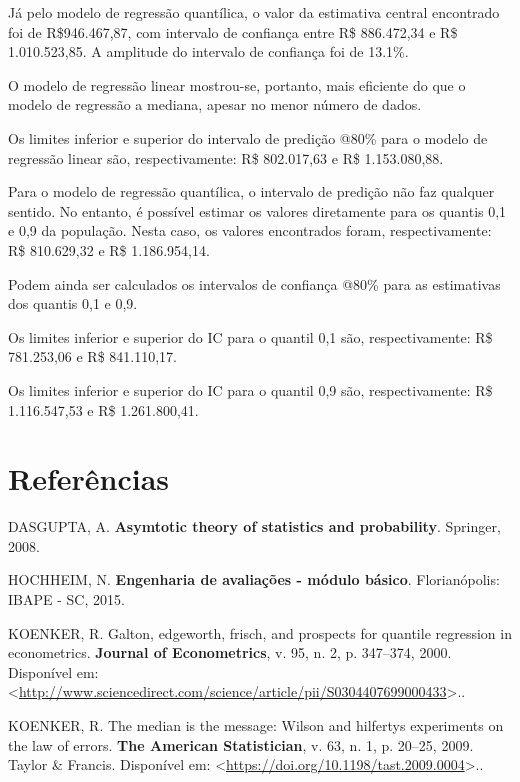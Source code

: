 \documentclass[a4paper, 12pt]{article}
\begin{document}
Já pelo modelo de regressão quantílica, o valor da estimativa central
encontrado foi de R\$946.467,87, com intervalo de confiança entre R\$
886.472,34 e R\$ 1.010.523,85. A amplitude do intervalo de confiança foi
de 13.1\%.

O modelo de regressão linear mostrou-se, portanto, mais eficiente do que
o modelo de regressão a mediana, apesar no menor número de dados.

Os limites inferior e superior do intervalo de predição @80\% para o
modelo de regressão linear são, respectivamente: R\$ 802.017,63 e R\$
1.153.080,88.

Para o modelo de regressão quantílica, o intervalo de predição não faz
qualquer sentido. No entanto, é possível estimar os valores diretamente
para os quantis 0,1 e 0,9 da população. Nesta caso, os valores
encontrados foram, respectivamente: R\$ 810.629,32 e R\$ 1.186.954,14.

Podem ainda ser calculados os intervalos de confiança @80\% para as
estimativas dos quantis 0,1 e 0,9.

Os limites inferior e superior do IC para o quantil 0,1 são,
respectivamente: R\$ 781.253,06 e R\$ 841.110,17.

Os limites inferior e superior do IC para o quantil 0,9 são,
respectivamente: R\$ 1.116.547,53 e R\$ 1.261.800,41.

\hypertarget{referencias}{%
\section*{Referências}\label{referencias}}

\hypertarget{refs}{}
\leavevmode\hypertarget{ref-dasGupta}{}%
DASGUPTA, A. \textbf{Asymtotic theory of statistics and probability}.
Springer, 2008.

\leavevmode\hypertarget{ref-hochheim}{}%
HOCHHEIM, N. \textbf{Engenharia de avaliações - módulo básico}.
Florianópolis: IBAPE - SC, 2015.

\leavevmode\hypertarget{ref-koenker2000}{}%
KOENKER, R. Galton, edgeworth, frisch, and prospects for quantile
regression in econometrics. \textbf{Journal of Econometrics}, v. 95, n.
2, p. 347--374, 2000. Disponível em:
\textless{}\url{http://www.sciencedirect.com/science/article/pii/S0304407699000433}\textgreater{}..

\leavevmode\hypertarget{ref-mim}{}%
KOENKER, R. The median is the message: Wilson and hilfertys experiments
on the law of errors. \textbf{The American Statistician}, v. 63, n. 1,
p. 20--25, 2009. Taylor \& Francis. Disponível em:
\textless{}\url{https://doi.org/10.1198/tast.2009.0004}\textgreater{}..
\end{document}
